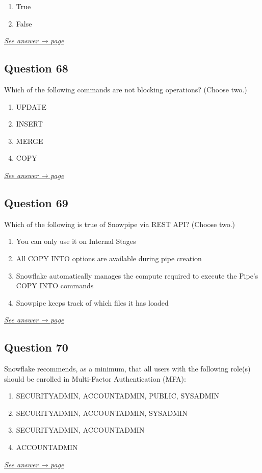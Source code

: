 \documentclass[12pt]{article}
\newcommand{\seeanswer}[1]{%
  \par\smallskip\emph{\hyperref[ans:#1]{See answer → page \pageref{ans:#1}}}%
}
\begin{document}
\begin{enumerate}[label=\Alph*.]
  \item True
  \item False
\end{enumerate}
\seeanswer{67}

\subsection*{Question 68}\label{q:68}
Which of the following commands are not blocking operations? (Choose two.)

\begin{enumerate}[label=\Alph*.]
  \item UPDATE
  \item INSERT
  \item MERGE
  \item COPY
\end{enumerate}
\seeanswer{68}

\subsection*{Question 69}\label{q:69}
Which of the following is true of Snowpipe via REST API? (Choose two.)

\begin{enumerate}[label=\Alph*.]
  \item You can only use it on Internal Stages
  \item All COPY INTO options are available during pipe creation
  \item Snowflake automatically manages the compute required to execute the Pipe's COPY INTO commands
  \item Snowpipe keeps track of which files it has loaded
\end{enumerate}
\seeanswer{69}

\subsection*{Question 70}\label{q:70}
Snowflake recommends, as a minimum, that all users with the following role(s) should be enrolled in Multi-Factor Authentication (MFA):

\begin{enumerate}[label=\Alph*.]
  \item SECURITYADMIN, ACCOUNTADMIN, PUBLIC, SYSADMIN
  \item SECURITYADMIN, ACCOUNTADMIN, SYSADMIN
  \item SECURITYADMIN, ACCOUNTADMIN
  \item ACCOUNTADMIN
\end{enumerate}
\seeanswer{70}
\end{document}
